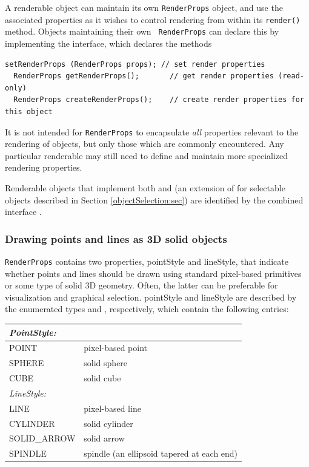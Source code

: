 A renderable object can maintain its own {\tt RenderProps} object, and
use the associated properties as it wishes to control rendering from
within its {\tt render()} method. Objects maintaining their own {\tt
RenderProps} can declare this by implementing the
 interface, which
declares the methods
%
\begin{lstlisting}[]
  setRenderProps (RenderProps props); // set render properties
  RenderProps getRenderProps();       // get render properties (read-only)
  RenderProps createRenderProps();    // create render properties for this object
\end{lstlisting}
%
\begin{sideblock}
It is not intended for {\tt RenderProps} to encapsulate {\it all}
properties relevant to the rendering of objects, but only those which
are commonly encountered. Any particular renderable may still need to
define and maintain more specialized rendering properties.
\end{sideblock}

\begin{sideblock}
Renderable objects that implement both
 and
 (an extension of
 for selectable objects
described in Section \ref{objectSelection:sec}) are identified by the
combined interface .
\end{sideblock}

\subsubsection{Drawing points and lines as 3D solid objects}

{\tt RenderProps} contains two properties, {\sf pointStyle} and {\sf
lineStyle}, that indicate whether points and lines should be drawn
using standard pixel-based primitives or some type of solid 3D
geometry.  Often, the latter can be preferable for visualization and
graphical selection.  {\sf pointStyle} and {\sf lineStyle} are
described by the enumerated types
 and
, respectively, which
contain the following entries:

\begin{center}
\begin{tabular}{|ll|}
\hline 
{\it PointStyle:} & \\
\hline 
POINT & pixel-based point \\
SPHERE & solid sphere \\
CUBE & solid cube\\
\hline
{\it LineStyle:} & \\
\hline 
LINE & pixel-based line \\
CYLINDER & solid cylinder \\
SOLID\_ARROW & solid arrow \\
SPINDLE & spindle (an ellipsoid tapered at each end) \\
\hline
\end{tabular}
\end{center}


